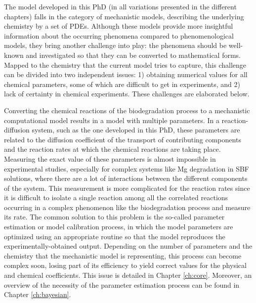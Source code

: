 The model developed in this PhD (in all variations presented in the different chapters) falls in the category of mechanistic models, describing the underlying chemistry by a set of \gls{PDE}s. Although these models provide more insightful information about the occurring phenomena compared to phenomenological models, they bring another challenge into play: the phenomena should be well-known and investigated so that they can be converted to mathematical forms. Mapped to the chemistry that the current model tries to capture, this challenge can be divided into two independent issues: 1) obtaining numerical values for all chemical parameters, some of which are difficult to get in experiments, and 2) lack of certainty in chemical experiments. These challenges are elaborated below.

Converting the chemical reactions of the biodegradation process to a mechanistic computational model results in a model with multiple parameters. In a reaction-diffusion system, such as the one developed in this PhD, these parameters are related to the diffusion coefficient of the transport of contributing components and the reaction rates at which the chemical reactions are taking place. Measuring the exact value of these parameters is almost impossible in experimental studies, especially for complex systems like Mg degradation in \gls{SBF} solutions, where there are a lot of interactions between the different components of the system. This measurement is more complicated for the reaction rates since it is difficult to isolate a single reaction among all the correlated reactions occurring in a complex phenomenon like the biodegradation process and measure its rate. The common solution to this problem is the so-called parameter estimation or model calibration process, in which the model parameters are optimized using an appropriate routine so that the model reproduces the experimentally-obtained output. Depending on the number of parameters and the chemistry that the mechanistic model is representing, this process can become complex soon, losing part of its efficiency to yield correct values for the physical and chemical coefficients. This issue is detailed in Chapter \ref{ch:core}. Moreover, an overview of the necessity of the parameter estimation process can be found in Chapter \ref{ch:bayesian}.

